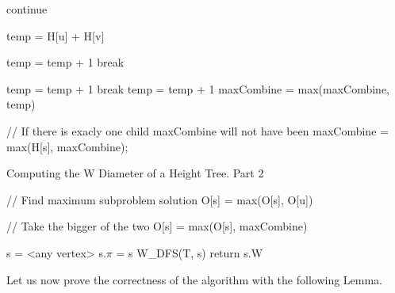\begin{algorithm}{}
\begin{algorithmic}[1]
                \State continue
            \EndIf

            \State temp = H[u] + H[v]

                        \State temp = temp + 1
                        \State break
                    \EndIf
                \EndFor
            \EndIf

                        \State temp = temp + 1
                        \State break
                    \EndIf
                \EndFor
            \EndIf
                \State temp = temp + 1
            \EndIf
            \State maxCombine = max(maxCombine, temp)
        \EndFor

    // If there is exacly one child maxCombine will not have been
    \State maxCombine = max(H[s], maxCombine);

    \EndFor

\end{algorithmic}
\end{algorithm}

\begin{algorithm}{}
\caption{Computing the W Diameter of a Height Tree. Part 2}
\begin{algorithmic}[1]

    \State // Find maximum subproblem solution
        \State O[s] = max(O[s], O[u])
    \EndFor

    \State // Take the bigger of the two
    \State O[s] = max(O[s], maxCombine)


    \State s = <any vertex>
    \State s.$\pi$ = s
    \State W\_DFS(T, s)
    \State return s.W
\EndFunction

\end{algorithmic}
\end{algorithm}


Let us now prove the correctness of the algorithm with the following Lemma.

